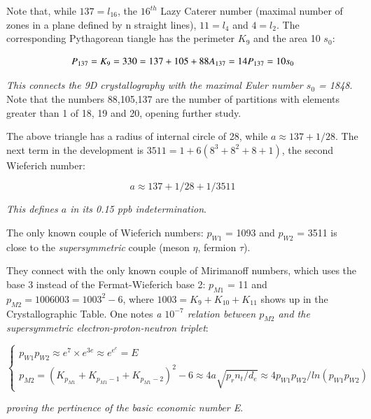 \documentclass[a4paper,9pt]{article}
\begin{document}
Note that, while $137 = l_{16}$, the $16^{th}$ Lazy Caterer number (maximal number of zones in a plane defined by n straight lines), $11 = l_4$ and $4 = l_2$. The corresponding Pythagorean tiangle has the perimeter $K_9$ and the area 10 $s_0$:
 
 \begin{equation}\label{Eq27}  
 P_{137} = K_9 = 330 = 137 + 105 + 88 \\
 A_{137}  = 14 P_{137} = 10 s_0
 \end{equation}

\textit{This connects the 9D crystallography with the maximal Euler number $s_0$ = 1848}. Note that the numbers 88,105,137 are the number of partitions with elements greater than 1 of 18, 19 and 20, opening further study.

The above triangle has a radius of internal circle of 28, while $a \approx 137 + 1/28$. The next term in the development is $3511 = 1+ 6(8^3 + 8^2 + 8 +1)$, the second Wieferich number: \cite{Ribenboim}

\begin{equation}
a \approx 137 + 1/28 + 1/3511
\end{equation}

\textit {This defines $a$ in its 0.15 ppb indetermination}. 

The only known couple of Wieferich numbers: $p_{W1}$ = 1093 and $p_{W2}$ = 3511 is close to the \textit {supersymmetric} couple (meson $\eta$, fermion $\tau$). 

They connect with the only known couple of Mirimanoff numbers, which uses the base 3 instead of the Fermat-Wieferich base 2: $p_{M1}$ = 11 and $p_{M2} = 1006003 = 1003^2 - 6$, where $1003 = K_9 + K_{10} + K_{11}$ shows up in the Crystallographic Table. 
One notes \textit{ a $10^{-7}$ relation between $p_{M2}$ and the supersymmetric electron-proton-neutron triplet}:


\begin{equation}
 \left\{
    \begin{array}{ll}
    p_{W1} p_{W2} \approx e^7 \times e^{3e} \approx  e^{e^e} = E\\
    
         p_{M2} = (K_{p_{M1}} + K_{p_{M1}-1} + K_{p_{M1}-2})^2 - 6 \approx 4a \sqrt {p_rn_t/d_e} \approx 4 p_{W1} p_{W2}/ln(p_{W1} p_{W2})     

    \end{array}
\right.
\end{equation}

\textit{proving the pertinence of the basic economic number E}.
\end{document}
